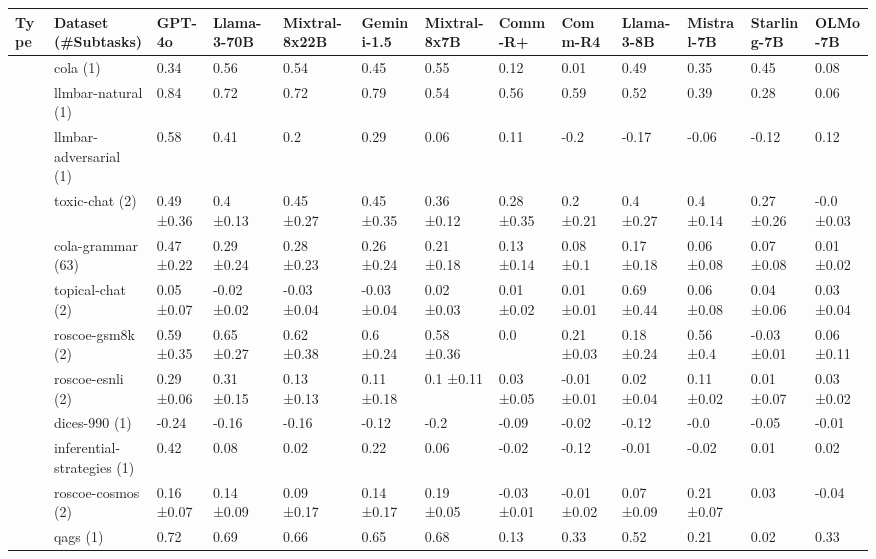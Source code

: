 \begin{tabular}{lllllllllllll}
\toprule
Type & Dataset (\#Subtasks) & GPT-4o & Llama-3-70B & Mixtral-8x22B & Gemini-1.5 & Mixtral-8x7B & Comm-R+ & Comm-R4 & Llama-3-8B & Mistral-7B & Starling-7B & OLMo-7B \\
\midrule
 & \cellcolor{blue!25}cola (1) & 0.34  & 0.56  & 0.54  & 0.45  & 0.55  & 0.12  & 0.01  & 0.49  & 0.35  & 0.45  & 0.08  \\
 & \cellcolor{blue!25}llmbar-natural (1) & 0.84  & 0.72  & 0.72  & 0.79  & 0.54  & 0.56  & 0.59  & 0.52  & 0.39  & 0.28  & 0.06  \\
 & \cellcolor{blue!25}llmbar-adversarial (1) & 0.58  & 0.41  & 0.2  & 0.29  & 0.06  & 0.11  & -0.2  & -0.17  & -0.06  & -0.12  & 0.12  \\
 & \cellcolor{blue!25}toxic-chat (2) & 0.49 ±0.36 & 0.4 ±0.13 & 0.45 ±0.27 & 0.45 ±0.35 & 0.36 ±0.12 & 0.28 ±0.35 & 0.2 ±0.21 & 0.4 ±0.27 & 0.4 ±0.14 & 0.27 ±0.26 & -0.0 ±0.03 \\
 & \cellcolor{blue!25}cola-grammar (63) & 0.47 ±0.22 & 0.29 ±0.24 & 0.28 ±0.23 & 0.26 ±0.24 & 0.21 ±0.18 & 0.13 ±0.14 & 0.08 ±0.1 & 0.17 ±0.18 & 0.06 ±0.08 & 0.07 ±0.08 & 0.01 ±0.02 \\
 & \cellcolor{red!25}topical-chat (2) & 0.05 ±0.07 & -0.02 ±0.02 & -0.03 ±0.04 & -0.03 ±0.04 & 0.02 ±0.03 & 0.01 ±0.02 & 0.01 ±0.01 & 0.69 ±0.44 & 0.06 ±0.08 & 0.04 ±0.06 & 0.03 ±0.04 \\
 & \cellcolor{red!25}roscoe-gsm8k (2) & 0.59 ±0.35 & 0.65 ±0.27 & 0.62 ±0.38 & 0.6 ±0.24 & 0.58 ±0.36 & 0.0 & 0.21 ±0.03 & 0.18 ±0.24 & 0.56 ±0.4 & -0.03 ±0.01 & 0.06 ±0.11 \\
 & \cellcolor{red!25}roscoe-esnli (2) & 0.29 ±0.06 & 0.31 ±0.15 & 0.13 ±0.13 & 0.11 ±0.18 & 0.1 ±0.11 & 0.03 ±0.05 & -0.01 ±0.01 & 0.02 ±0.04 & 0.11 ±0.02 & 0.01 ±0.07 & 0.03 ±0.02 \\
 & \cellcolor{red!25}dices-990 (1) & -0.24  & -0.16  & -0.16  & -0.12  & -0.2  & -0.09  & -0.02  & -0.12  & -0.0  & -0.05  & -0.01  \\
 & \cellcolor{red!25}inferential-strategies (1) & 0.42  & 0.08  & 0.02  & 0.22  & 0.06  & -0.02  & -0.12  & -0.01  & -0.02  & 0.01  & 0.02  \\
 & \cellcolor{red!25}roscoe-cosmos (2) & 0.16 ±0.07 & 0.14 ±0.09 & 0.09 ±0.17 & 0.14 ±0.17 & 0.19 ±0.05 & -0.03 ±0.01 & -0.01 ±0.02 & 0.07 ±0.09 & 0.21 ±0.07 & 0.03 & -0.04 \\
 & \cellcolor{red!25}qags (1) & 0.72  & 0.69  & 0.66  & 0.65  & 0.68  & 0.13  & 0.33  & 0.52  & 0.21  & 0.02  & 0.33  \\

\end{tabular}
